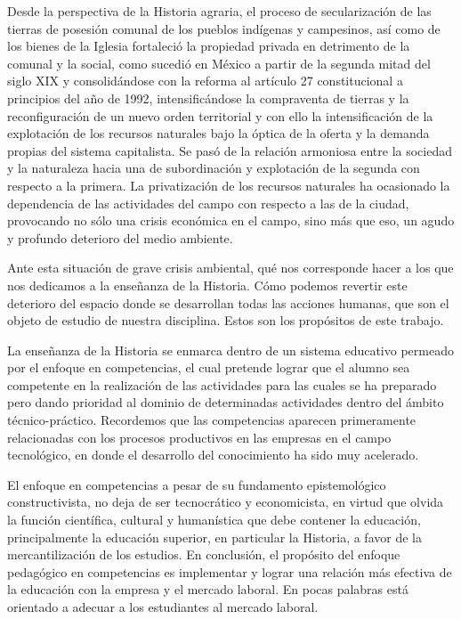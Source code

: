 Desde la perspectiva de la Historia agraria, el proceso de 
secularización de las tierras de posesión comunal de los pueblos 
indígenas y campesinos, así como de los bienes de la Iglesia fortaleció 
la propiedad privada en detrimento de la comunal y la social, como 
sucedió en México a partir de la segunda mitad del siglo XIX y 
consolidándose con la reforma al artículo 27 constitucional a 
principios del año de 1992, intensificándose la compraventa de tierras 
y la reconfiguración de un nuevo orden territorial y con ello la 
intensificación de la explotación de los recursos naturales bajo la 
óptica de la oferta y la demanda propias del sistema capitalista. Se 
pasó de la relación armoniosa entre la sociedad y la naturaleza hacia 
una de subordinación y explotación de la segunda con respecto a la 
primera. La privatización de los recursos naturales ha ocasionado la 
dependencia de las actividades del campo con respecto a las de la 
ciudad, provocando no sólo una crisis económica en el campo, sino más 
que eso, un agudo y profundo deterioro del medio ambiente. 

Ante esta situación de grave crisis ambiental, qué nos corresponde 
hacer a los que nos dedicamos a la enseñanza de la Historia. Cómo 
podemos revertir este deterioro del espacio donde se desarrollan todas 
las acciones humanas, que son el objeto de estudio de nuestra 
disciplina. Estos son los propósitos de este trabajo. 

La enseñanza de la Historia se enmarca dentro de un sistema educativo 
permeado por el enfoque en competencias, el cual pretende lograr que el 
alumno sea competente en la realización de las actividades para las 
cuales se ha preparado pero dando prioridad al dominio de determinadas 
actividades dentro del ámbito técnico-práctico. Recordemos que las 
competencias aparecen primeramente relacionadas con los procesos 
productivos en las empresas en el campo tecnológico, en donde el 
desarrollo del conocimiento ha sido muy acelerado.

\enlargethispage{1\baselineskip}
El enfoque en competencias a pesar de su fundamento epistemológico 
constructivista, no deja de ser tecnocrático y economicista, en virtud 
que olvida la función científica, cultural y humanística que debe 
contener la educación, principalmente la educación superior, en 
particular la Historia, a favor de la mercantilización de los estudios. 
En conclusión, el propósito del enfoque pedagógico en competencias es 
implementar y lograr una relación más efectiva de la educación con la 
empresa y el mercado laboral. En pocas palabras está orientado a 
adecuar a los estudiantes al mercado laboral.

